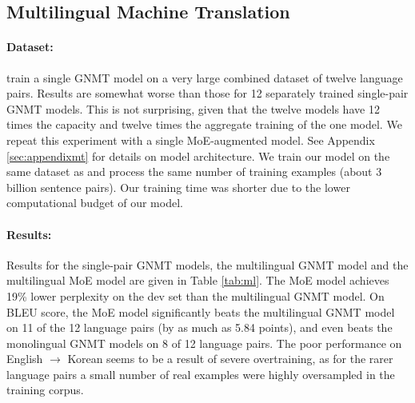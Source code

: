 \documentclass{article} %
\begin{document}
\subsection{Multilingual Machine Translation}
\label{sec:mlmt}

\paragraph{Dataset:} \citep{Johnson16} train a single GNMT \citep{GNMT} model on a very large combined dataset of twelve language pairs.  Results are somewhat worse than those for 12 separately trained single-pair GNMT models.  This is not surprising, given that the twelve models have 12 times the capacity and twelve times the aggregate training of the one model.  We repeat this experiment with a single MoE-augmented model.  See Appendix \ref{sec:appendixmt} for details on model architecture.  We train our model on the same dataset as \citep{Johnson16} and process the same number of training examples (about 3 billion sentence pairs).  Our training time was shorter due to the lower computational budget of our model.

\paragraph{Results:} Results for the single-pair GNMT models, the multilingual GNMT model and the multilingual MoE model are given in Table \ref{tab:ml}.   The MoE model achieves 19\% lower perplexity on the dev set than the multilingual GNMT model.   On BLEU score, the MoE model significantly beats the multilingual GNMT model on 11 of the 12 language pairs (by as much as 5.84 points), and even beats the monolingual GNMT models on 8 of 12 language pairs.  The poor performance on English $\rightarrow$ Korean seems to be a result of severe overtraining, as for the rarer language pairs a small number of real examples were highly oversampled in the training corpus. 
\end{document}
